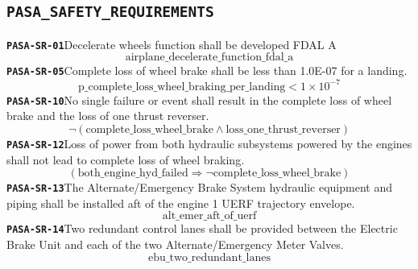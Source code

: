 \documentclass[11pt,a4paper]{article}
\begin{document}
\subsection*{\texttt{PASA\_SAFETY\_REQUIREMENTS}}
\noindent\textbf{\texttt{PASA-SR-01}}\quad Decelerate wheels function shall be developed FDAL A
\begin{dmath*}
\text{airplane\_decelerate\_function\_fdal\_a}
\end{dmath*}
\noindent\textbf{\texttt{PASA-SR-05}}\quad [FF1.1] Complete loss of wheel brake shall be less than 1.0E-07 for a landing.
\begin{dmath*}
\text{p\_complete\_loss\_wheel\_braking\_per\_landing} < 1 \times 10^{-7}
\end{dmath*}
\noindent\textbf{\texttt{PASA-SR-10}}\quad No single failure or event shall result in the complete loss of wheel brake and the loss of one thrust reverser.
\begin{dmath*}
\neg (\text{complete\_loss\_wheel\_brake} \wedge \text{loss\_one\_thrust\_reverser})
\end{dmath*}
\noindent\textbf{\texttt{PASA-SR-12}}\quad Loss of power from both hydraulic subsystems powered by the engines shall not lead to complete loss of wheel braking.
\begin{dmath*}
(\text{both\_engine\_hyd\_failed} \Rightarrow \neg \text{complete\_loss\_wheel\_brake})
\end{dmath*}
\noindent\textbf{\texttt{PASA-SR-13}}\quad The Alternate/Emergency Brake System hydraulic equipment and piping shall be installed aft of the engine 1 UERF trajectory envelope.
\begin{dmath*}
\text{alt\_emer\_aft\_of\_uerf}
\end{dmath*}
\noindent\textbf{\texttt{PASA-SR-14}}\quad Two redundant control lanes shall be provided between the Electric Brake Unit and each of the two Alternate/Emergency Meter Valves.
\begin{dmath*}
\text{ebu\_two\_redundant\_lanes}
\end{dmath*}
\end{document}
